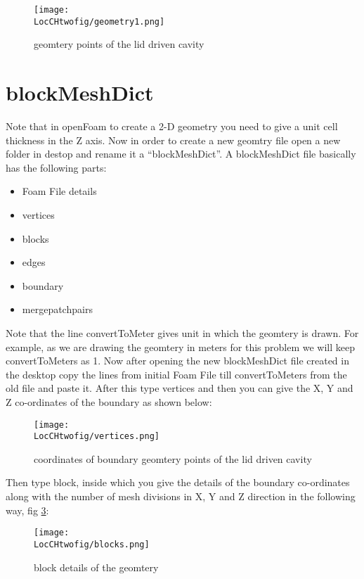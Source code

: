 \begin{figure}[ht]  
\begin{center}  
\texttt{[image: \\LocCHtwofig/geometry1.png]}
\caption{geomtery points of the lid driven cavity}
\label{geometry}
\end{center}  
\end{figure}
 
\section{blockMeshDict} 
\flushleft Note that in openFoam to create a 2-D geometry you need to give a unit cell thickness in the Z axis. Now in order to create a new geomtry file open a new folder in destop and rename it a “blockMeshDict”. 
\flushleft A blockMeshDict file basically has the following parts:

\begin{itemize}
\item Foam File details
\item vertices
\item blocks
\item edges
\item boundary
\item mergepatchpairs
\end{itemize}

\flushleft Note that the line convertToMeter gives unit in which the geomtery is drawn. For example, as we are drawing the geomtery in meters for this problem we will keep convertToMeters as 1. Now after opening the new blockMeshDict file created in the desktop copy the lines from initial Foam File till convertToMeters from the old file and paste it. After this type vertices and then you can give the X, Y and Z co-ordinates of the boundary as shown below:

\begin{figure}[ht]  
\begin{center}  
\texttt{[image: \\LocCHtwofig/vertices.png]}
\caption{coordinates of boundary geomtery points of the lid driven cavity}
\label{vertices}
\end{center}  
\end{figure}

\flushleft Then type block, inside which you give the details of the boundary co-ordinates along with the number of mesh divisions in X, Y and Z direction in the following way, fig \ref{blocks}:

\begin{figure}[ht]  
\begin{center}  
\texttt{[image: \\LocCHtwofig/blocks.png]}
\caption{block details of the geomtery}
\label{blocks}
\end{center}  
\end{figure}

